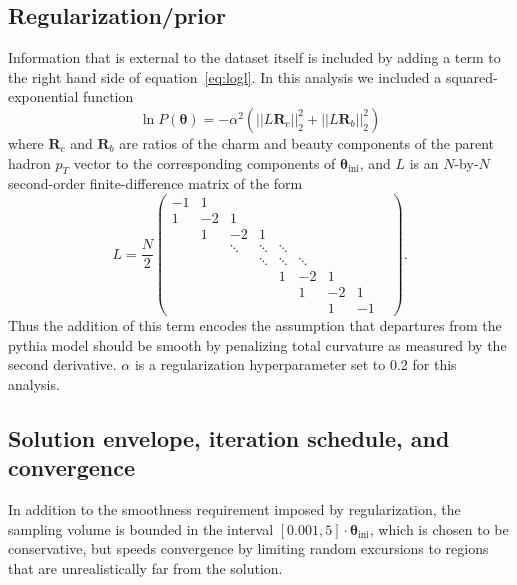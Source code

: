 \documentclass[12pt]{article}
\newcommand{\rvec}{\mathbf{R}}
\newcommand{\thetavec}{\mathbf{\theta}}
\newcommand{\prior}{P(\thetavec)}
\begin{document}
\subsection{Regularization/prior}
Information that is external to the dataset itself is included by adding a term to the right hand side of equation~\ref{eq:logl}. In this analysis we included a squared-exponential function
\begin{equation} \label{eq:l2reg}
  \ln \prior = -\alpha^2 \left(||L \rvec_c||_2^2 + ||L \rvec_b||_2^2\right)
\end{equation}
where $\rvec_c$ and $\rvec_b$ are ratios of the charm and beauty components of the parent hadron $p_T$ vector to the corresponding components of $\thetavec_{\mathrm{ini}}$, and $L$ is an $N$-by-$N$ second-order finite-difference matrix of the form
\begin{equation} \label{eq:lmatrix}
L = \frac{N}{2}
\begin{pmatrix}
-1 & 1 & & & & & &\\
1 & -2 & 1 & & & & &\\
& 1 & -2 & 1 & & & &\\

& & \ddots & \ddots & \ddots & & & &\\
& & & \ddots & \ddots & \ddots & & & \\

& & & & 1 & -2 & 1 &\\
& & & & & 1 & -2 & 1\\
& & & & & & 1 & -1
\end{pmatrix}.
\end{equation}
Thus the addition of this term encodes the assumption that departures from the pythia model should be smooth by penalizing total curvature as measured by the second derivative. $\alpha$ is a regularization hyperparameter set to 0.2 for this analysis.

\subsection{Solution envelope, iteration schedule, and convergence}
In addition to the smoothness requirement imposed by regularization, the sampling volume is bounded in the interval $[0.001, 5] \cdot \thetavec_{\mathrm{ini}}$, which is chosen to be conservative, but speeds convergence by limiting random excursions to regions that are unrealistically far from the solution.
\end{document}
